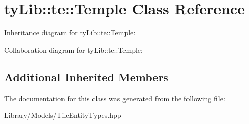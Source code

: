 \hypertarget{classty_lib_1_1te_1_1_temple}{}\section{ty\+Lib\+:\+:te\+:\+:Temple Class Reference}
\label{classty_lib_1_1te_1_1_temple}


Inheritance diagram for ty\+Lib\+:\+:te\+:\+:Temple\+:


Collaboration diagram for ty\+Lib\+:\+:te\+:\+:Temple\+:
\subsection*{Additional Inherited Members}


The documentation for this class was generated from the following file\+:\begin{DoxyCompactItemize}
\item 
Library/\+Models/Tile\+Entity\+Types.\+hpp\end{DoxyCompactItemize}
